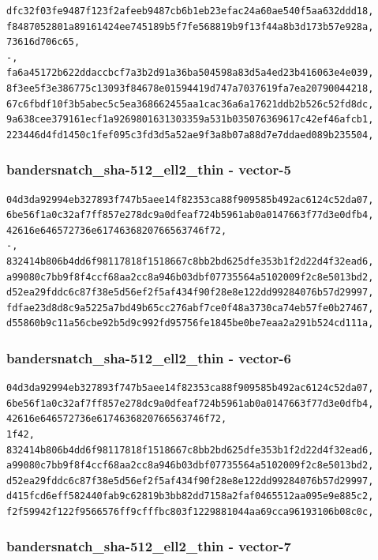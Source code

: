\documentclass[
]{article}
\begin{document}
\begin{verbatim}
dfc32f03fe9487f123f2afeeb9487cb6b1eb23efac24a60ae540f5aa632ddd18,
f8487052801a89161424ee745189b5f7fe568819b9f13f44a8b3d173b57e928a,
73616d706c65,
-,
fa6a45172b622ddaccbcf7a3b2d91a36ba504598a83d5a4ed23b416063e4e039,
8f3ee5f3e386775c13093f84678e01594419d747a7037619fa7ea20790044218,
67c6fbdf10f3b5abec5c5ea368662455aa1cac36a6a17621ddb2b526c52fd8dc,
9a638cee379161ecf1a9269801631303359a531b035076369617c42ef46afcb1,
223446d4fd1450c1fef095c3fd3d5a52ae9f3a8b07a88d7e7ddaed089b235504,
\end{verbatim}

\subsubsection{bandersnatch\_sha-512\_ell2\_thin -
vector-5}\label{bandersnatch_sha-512_ell2_thin---vector-5}

\begin{verbatim}
04d3da92994eb327893f747b5aee14f82353ca88f909585b492ac6124c52da07,
6be56f1a0c32af7ff857e278dc9a0dfeaf724b5961ab0a0147663f77d3e0dfb4,
42616e646572736e6174636820766563746f72,
-,
832414b806b4dd6f98117818f1518667c8bb2bd625dfe353b1f2d22d4f32ead6,
a99080c7bb9f8f4ccf68aa2cc8a946b03dbf07735564a5102009f2c8e5013bd2,
d52ea29fddc6c87f38e5d56ef2f5af434f90f28e8e122dd99284076b57d29997,
fdfae23d8d8c9a5225a7bd49b65cc276abf7ce0f48a3730ca74eb57fe0b27467,
d55860b9c11a56cbe92b5d9c992fd95756fe1845be0be7eaa2a291b524cd111a,
\end{verbatim}

\subsubsection{bandersnatch\_sha-512\_ell2\_thin -
vector-6}\label{bandersnatch_sha-512_ell2_thin---vector-6}

\begin{verbatim}
04d3da92994eb327893f747b5aee14f82353ca88f909585b492ac6124c52da07,
6be56f1a0c32af7ff857e278dc9a0dfeaf724b5961ab0a0147663f77d3e0dfb4,
42616e646572736e6174636820766563746f72,
1f42,
832414b806b4dd6f98117818f1518667c8bb2bd625dfe353b1f2d22d4f32ead6,
a99080c7bb9f8f4ccf68aa2cc8a946b03dbf07735564a5102009f2c8e5013bd2,
d52ea29fddc6c87f38e5d56ef2f5af434f90f28e8e122dd99284076b57d29997,
d415fcd6eff582440fab9c62819b3bb82dd7158a2faf0465512aa095e9e885c2,
f2f59942f122f9566576ff9cfffbc803f1229881044aa69cca96193106b08c0c,
\end{verbatim}

\subsubsection{bandersnatch\_sha-512\_ell2\_thin -
vector-7}\label{bandersnatch_sha-512_ell2_thin---vector-7}
\end{document}
